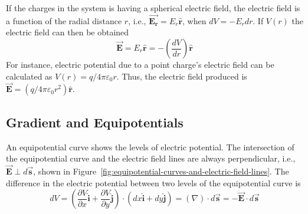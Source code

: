 If the charges in the system is having a spherical electric field, the electric field is a function of the radial distance $r$, i.e., $\vec{\boldsymbol{E_r}}=E_r\hat{\boldsymbol{r}}$, when $dV = -E_r dr$. If $V(r)$ the electric field can then be obtained
\begin{equation*}
  \vec{\boldsymbol{E}} = E_r\hat{\boldsymbol{r}} = -\left( \frac{dV}{dr} \right)\hat{\boldsymbol{r}}
\end{equation*}
For instance, electric potential due to a point charge's electric field can be calculated as $V(r)=q/4\pi\varepsilon_0 r$. Thus, the electric field produced is $\vec{\boldsymbol{E}}=(q/4\pi\varepsilon_0 r^2)\hat{\boldsymbol{r}}$.



\subsection{Gradient and Equipotentials}

An equipotential curve shows the levels of electric potential. The intersection of the equipotential curve and the electric field lines are always perpendicular, i.e., $\vec{\boldsymbol{E}} \perp d\vec{\boldsymbol{s}}$, shown in Figure~\ref{fig:equipotential-curves-and-electric-field-lines}. The difference in the electric potential between two levels of the equipotential curve is 
\begin{equation*}
  dV = \left( \frac{\partial V}{\partial x}\hat{\boldsymbol{i}} + \frac{\partial V}{\partial y}\hat{\boldsymbol{j}} \right)\cdot\left( dx\hat{\boldsymbol{i}} + dy\hat{\boldsymbol{j}} \right) = (\nabla)\cdot d\vec{\boldsymbol{s}} = -\vec{\boldsymbol{E}}\cdot d\vec{\boldsymbol{s}}
\end{equation*}



